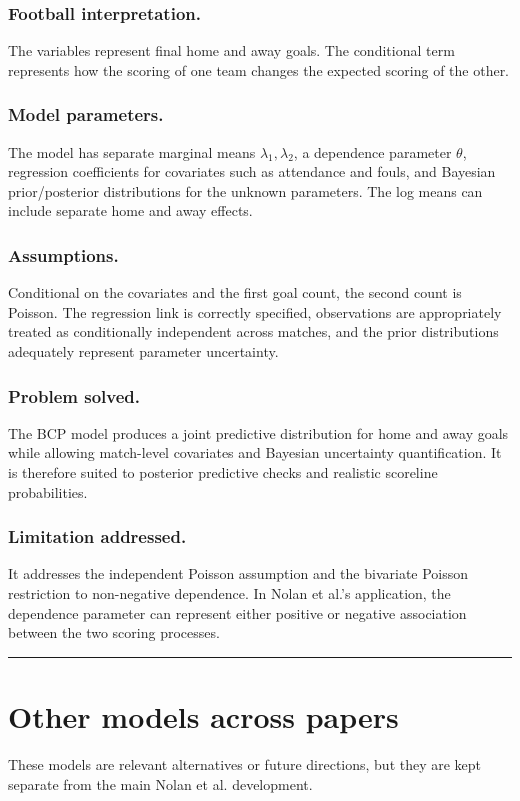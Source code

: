 \documentclass[11pt,a4paper]{amsart}
\numberwithin{equation}{section}
\begin{document}
\subsubsection*{Football interpretation.} The variables represent final home and away goals. The conditional term represents how the scoring of one team changes the expected scoring of the other.
\subsubsection*{Model parameters.} The model has separate marginal means $\lambda_1,\lambda_2$, a dependence parameter $\theta$, regression coefficients for covariates such as attendance and fouls, and Bayesian prior/posterior distributions for the unknown parameters. The log means can include separate home and away effects.
\subsubsection*{Assumptions.} Conditional on the covariates and the first goal count, the second count is Poisson. The regression link is correctly specified, observations are appropriately treated as conditionally independent across matches, and the prior distributions adequately represent parameter uncertainty.
\subsubsection*{Problem solved.} The BCP model produces a joint predictive distribution for home and away goals while allowing match-level covariates and Bayesian uncertainty quantification. It is therefore suited to posterior predictive checks and realistic scoreline probabilities.
\subsubsection*{Limitation addressed.} It addresses the independent Poisson assumption and the bivariate Poisson restriction to non-negative dependence. In Nolan et al.'s application, the dependence parameter can represent either positive or negative association between the two scoring processes.

\noindent\rule{\textwidth}{0.8pt}

\section{Other models across papers}
These models are relevant alternatives or future directions, but they are kept separate
from the main Nolan et al. development.
\end{document}
